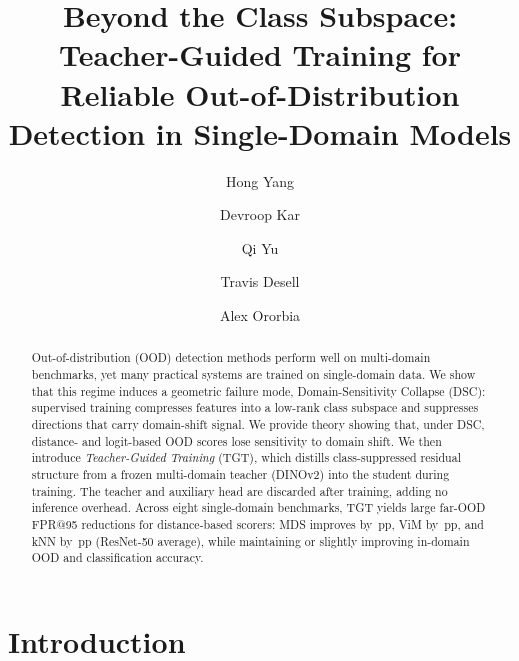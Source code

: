 \documentclass[runningheads]{llncs}
\begin{document}
\title{Beyond the Class Subspace: Teacher-Guided Training for Reliable Out-of-Distribution Detection in Single-Domain Models}

\author{Hong Yang \and
Devroop Kar \and
Qi Yu \and
Travis Desell \and
Alex Ororbia}


\maketitle

\begin{abstract}
Out-of-distribution (OOD) detection methods perform well on multi-domain benchmarks, yet many practical systems are trained on single-domain data. We show that this regime induces a geometric failure mode, Domain-Sensitivity Collapse (DSC): supervised training compresses features into a low-rank class subspace and suppresses directions that carry domain-shift signal. We provide theory showing that, under DSC, distance- and logit-based OOD scores lose sensitivity to domain shift. We then introduce \emph{Teacher-Guided Training} (TGT), which distills class-suppressed residual structure from a frozen multi-domain teacher (DINOv2) into the student during training. The teacher and auxiliary head are discarded after training, adding no inference overhead. Across eight single-domain benchmarks, TGT yields large far-OOD FPR@95 reductions for distance-based scorers: MDS improves by \FaroodMDSImprovementPPResNet{}\,pp, ViM by \FaroodViMImprovementPPResNet{}\,pp, and kNN by \FaroodKnnImprovementPPResNet{}\,pp (ResNet-50 average), while maintaining or slightly improving in-domain OOD and classification accuracy.
\end{abstract}


\section{Introduction}
\label{sec:intro}
\end{document}
